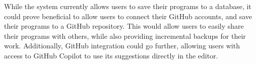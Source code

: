 \documentclass[../main.tex]{subfiles}
\begin{document}
            While the system currently allows users to save their programs to a database,
                it could prove beneficial to allow users to connect their GitHub accounts, and
                save their programs to a GitHub repository.
            This would allow users to easily share their programs with others, while also
                providing incremental backups for their work.
            Additionally, GitHub integration could go further, allowing users with access
                to GitHub Copilot to use its suggestions directly in the editor.
\end{document}
